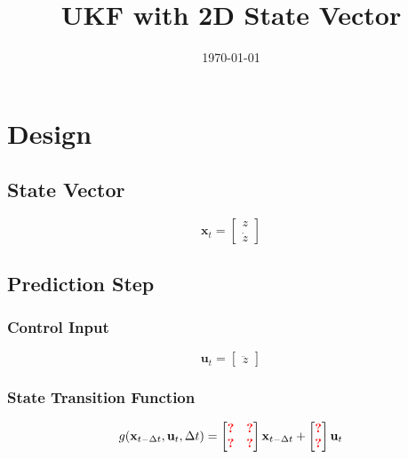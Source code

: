 \documentclass{article}
\title{UKF with 2D State Vector}
\author{}
\date{\today}
\newcommand{\todo}[1]{\textcolor{red}{\textbf{#1}}}
\begin{document}
\maketitle

\section{Design}

\subsection{State Vector}

\begin{equation}
  \mathbf{x}_t=\begin{bmatrix}
  z \\
  \dot z
  \end{bmatrix}
\end{equation}

\subsection{Prediction Step}

\subsubsection{Control Input}

\begin{equation}
  \mathbf{u}_t = \begin{bmatrix}
  \ddot z
  \end{bmatrix}
\end{equation}

\subsubsection{State Transition Function}

\begin{equation}
  g(\mathbf{x}_{t-\Delta t}, \mathbf{u}_t, \Delta t) = \begin{bmatrix}
  \todo{?} & \todo{?} \\
  \todo{?} & \todo{?}
\end{bmatrix}\mathbf{x}_{t-\Delta t} + \begin{bmatrix}
  \todo{?} \\
  \todo{?}
  \end{bmatrix}\mathbf{u}_t
\end{equation}
\end{document}
